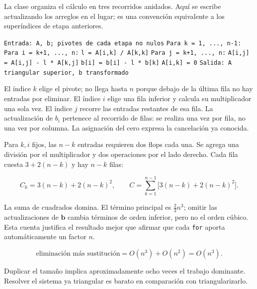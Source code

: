 \documentclass[12pt,a4paper]{article}
\begin{document}
La clase organiza el cálculo en tres recorridos anidados. Aquí se escribe actualizando los arreglos en el lugar; es una convención equivalente a los superíndices de etapa anteriores.

\begin{algorithm}[H]
\small\DontPrintSemicolon
\hspace*{0.0em}\texttt{Entrada: A, b; pivotes de cada etapa no nulos}\;
\hspace*{0.0em}\texttt{Para k = 1, ..., n-1:}\;
\hspace*{0.7em}\texttt{Para i = k+1, ..., n:}\;
\hspace*{1.4em}\texttt{l = A[i,k] / A[k,k]}\;
\hspace*{1.4em}\texttt{Para j = k+1, ..., n:}\;
\hspace*{2.0999999999999996em}\texttt{A[i,j] = A[i,j] - l * A[k,j]}\;
\hspace*{1.4em}\texttt{b[i] = b[i] - l * b[k]}\;
\hspace*{1.4em}\texttt{A[i,k] = 0}\;
\hspace*{0.0em}\texttt{Salida: A triangular superior, b transformado}\;
\end{algorithm}

El índice $k$ elige el pivote; no llega hasta $n$ porque debajo de la última fila no hay entradas por eliminar. El índice $i$ elige una fila inferior y calcula su multiplicador una sola vez. El índice $j$ recorre las entradas restantes de esa fila. La actualización de $b_i$ pertenece al recorrido de filas: se realiza una vez por fila, no una vez por columna. La asignación del cero expresa la cancelación ya conocida.

Para $k,i$ fijos, las $n-k$ entradas requieren dos flops cada una. Se agrega una división por el multiplicador y dos operaciones por el lado derecho. Cada fila cuesta $3+2(n-k)$ y hay $n-k$ filas:

\[
C_k=3(n-k)+2(n-k)^2,\qquad
C=\sum_{k=1}^{n-1}\bigl[3(n-k)+2(n-k)^2\bigr].
\]

La suma de cuadrados domina. El término principal es $\frac23n^3$; omitir las actualizaciones de $\mathbf b$ cambia términos de orden inferior, pero no el orden cúbico. Esta cuenta justifica el resultado mejor que afirmar que cada \texttt{for} aporta automáticamente un factor $n$.

\[
\boxed{\text{eliminación más sustitución}=O(n^3)+O(n^2)=O(n^3)}.
\]

Duplicar el tamaño implica aproximadamente ocho veces el trabajo dominante. Resolver el sistema ya triangular es barato en comparación con triangularizarlo.
\end{document}
